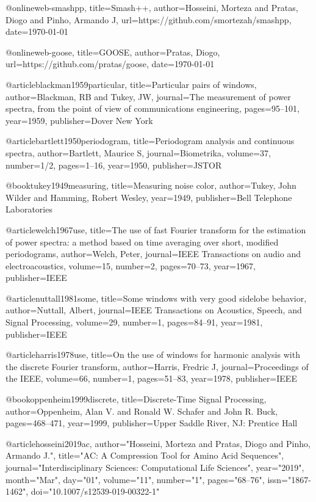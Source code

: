 @online{web-smashpp,
  title={Smash++},
  author={Hosseini, Morteza and Pratas, Diogo and Pinho, Armando J},
  url={https://github.com/smortezah/smashpp},
  date={\today}
}

@online{web-goose,
  title={GOOSE},
  author={Pratas, Diogo},
  url={https://github.com/pratas/goose},
  date={\today}
}

@article{blackman1959particular,
  title={Particular pairs of windows},
  author={Blackman, RB and Tukey, JW},
  journal={The measurement of power spectra, from the point of view of communications engineering},
  pages={95--101},
  year={1959},
  publisher={Dover New York}
}

@article{bartlett1950periodogram,
  title={Periodogram analysis and continuous spectra},
  author={Bartlett, Maurice S},
  journal={Biometrika},
  volume={37},
  number={1/2},
  pages={1--16},
  year={1950},
  publisher={JSTOR}
}

@book{tukey1949measuring,
  title={Measuring noise color},
  author={Tukey, John Wilder and Hamming, Robert Wesley},
  year={1949},
  publisher={Bell Telephone Laboratories}
}

@article{welch1967use,
  title={The use of fast {Fourier} transform for the estimation of power spectra: a method based on time averaging over short, modified periodograms},
  author={Welch, Peter},
  journal={IEEE Transactions on audio and electroacoustics},
  volume={15},
  number={2},
  pages={70--73},
  year={1967},
  publisher={IEEE}
}

@article{nuttall1981some,
  title={Some windows with very good sidelobe behavior},
  author={Nuttall, Albert},
  journal={IEEE Transactions on Acoustics, Speech, and Signal Processing},
  volume={29},
  number={1},
  pages={84--91},
  year={1981},
  publisher={IEEE}
}

@article{harris1978use,
  title={On the use of windows for harmonic analysis with the discrete {Fourier} transform},
  author={Harris, Fredric J},
  journal={Proceedings of the IEEE},
  volume={66},
  number={1},
  pages={51--83},
  year={1978},
  publisher={IEEE}
}

@book{oppenheim1999discrete,
  title={Discrete-Time Signal Processing},
  author={Oppenheim, Alan V. and Ronald W. Schafer and John R. Buck},
  pages={468--471},
  year={1999},
  publisher={Upper Saddle River, NJ: Prentice Hall}
}

@article{hosseini2019ac,
author="Hosseini, Morteza and Pratas, Diogo and Pinho, Armando J.",
title="{AC}: A Compression Tool for Amino Acid Sequences",
journal="Interdisciplinary Sciences: Computational Life Sciences",
year="2019",
month="Mar",
day="01",
volume="11",
number="1",
pages="68--76",
issn="1867-1462",
doi="10.1007/s12539-019-00322-1"
}















